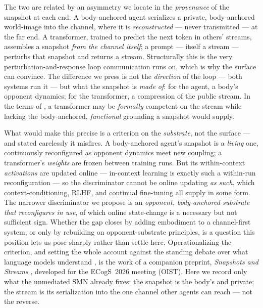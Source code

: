 \documentclass{article}
\begin{document}
The two are related by an asymmetry we locate in the \emph{provenance} of the
snapshot at each end.  A body-anchored agent serializes a private, body-anchored
world-image into the channel, where it is \emph{reconstructed} --- never
transmitted --- at the far end.  A transformer, trained to predict the next token
in others' streams, assembles a snapshot \emph{from the channel itself}; a prompt
--- itself a stream --- perturbs that snapshot and returns a stream.  Structurally
this is the very perturbation-and-response loop communication runs on, which is why
the surface can convince.  The difference we press is not the \emph{direction} of
the loop --- both systems run it --- but what the snapshot is \emph{made of}: for
the agent, a body's opponent dynamics; for the transformer, a compression of the
public stream.  In the terms of \citet{Mahowald2024DissociatingLanguageThought}, a
transformer may be \emph{formally} competent on the stream while lacking the
body-anchored, \emph{functional} grounding a snapshot would supply.

What would make this precise is a criterion on the \emph{substrate}, not the
surface --- and stated carelessly it misfires.  A body-anchored agent's snapshot is
a \emph{living} one, continuously reconfigured as opponent dynamics meet new
coupling; a transformer's \emph{weights} are frozen between training runs.  But its
within-context \emph{activations} are updated online --- in-context learning is
exactly such a within-run reconfiguration --- so the discriminator cannot be online
updating \emph{as such}, which context-conditioning, RLHF, and continual
fine-tuning all supply in some form.  The narrower discriminator we propose is an
\emph{opponent, body-anchored substrate that reconfigures in use}, of which online
state-change is a necessary but not sufficient sign.  Whether the gap closes by
adding embodiment to a channel-first system, or only by rebuilding on
opponent-substrate principles, is a question this position lets us pose sharply
rather than settle here.  Operationalizing the criterion, and setting the whole
account against the standing debate over what language models understand
\citep{Bender2021StochasticParrots,Shanahan2024TalkingAboutLLMs}, is the work of a
companion preprint, \emph{Snapshots and Streams}
\citep{Nagarjuna2026SnapshotsStreams}, developed for the ECogS~2026 meeting (OIST).
Here we record only what the unmediated SMN already fixes: the snapshot is the
body's and private; the stream is its serialization into the one channel other
agents can reach --- not the reverse.
\end{document}

